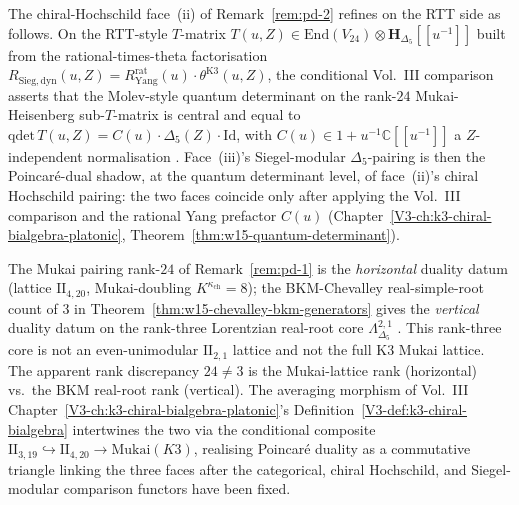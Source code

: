 \begin{remark}
\label{rem:pd-3-supplement}
The chiral-Hochschild face~(ii) of
Remark~\ref{rem:pd-2} refines on the
RTT side as follows. On the
RTT-style $T$-matrix $T(u,Z)\in\mathrm{End}(V_{24})\otimes
\mathbf H_{\Delta_5}[[u^{-1}]]$ built from the rational-times-theta
factorisation $R_{\mathrm{Sieg,dyn}}(u,Z) =
R^{\mathrm{rat}}_{\mathrm{Yang}}(u)\cdot\theta^{\mathrm{K3}}(u,Z)$,
the conditional Vol.~III comparison asserts that the Molev-style
quantum determinant on the rank-$24$
Mukai-Heisenberg sub-$T$-matrix is central and equal to
$\mathrm{qdet}\,T(u,Z) = C(u)\cdot\Delta_5(Z)\cdot\mathrm{Id}$, with
$C(u)\in 1+u^{-1}\mathbb C[[u^{-1}]]$ a $Z$-independent normalisation
\cite{Molev2007,GritsenkoNikulin1998,Gritsenko1999}. Face~(iii)'s
Siegel-modular $\Delta_5$-pairing is then the Poincar\'e-dual
shadow, at the quantum determinant level, of face~(ii)'s chiral
Hochschild pairing: the two faces coincide only after applying the
Vol.~III comparison and the rational Yang prefactor $C(u)$
(Chapter~\ref{V3-ch:k3-chiral-bialgebra-platonic},
Theorem~\ref{thm:w15-quantum-determinant}).
\end{remark}

\begin{remark}
\label{rem:pd-4-supplement}
The Mukai pairing rank-$24$ of Remark~\ref{rem:pd-1} is the
\emph{horizontal} duality datum (lattice $\mathrm{II}_{4,20}$,
Mukai-doubling $K^{\kappa_{\mathrm{ch}}}=8$); the
BKM-Chevalley real-simple-root count of $3$ in
Theorem~\ref{thm:w15-chevalley-bkm-generators} gives the
\emph{vertical} duality datum on the rank-three Lorentzian real-root
core $\Lambda^{2,1}_{\Delta_5}$
\cite{GritsenkoNikulin1997,GritsenkoNikulin1998}. This rank-three
core is not an even-unimodular $\mathrm{II}_{2,1}$ lattice and not
the full K3 Mukai lattice. The apparent rank discrepancy $24\neq3$ is the
Mukai-lattice rank (horizontal) vs.~the BKM real-root rank
(vertical). The averaging morphism of
Vol.~III Chapter~\ref{V3-ch:k3-chiral-bialgebra-platonic}'s
Definition~\ref{V3-def:k3-chiral-bialgebra} intertwines the two via the
conditional composite
$\mathrm{II}_{3,19}\hookrightarrow\mathrm{II}_{4,20}\to
\mathrm{Mukai}(K3)$, realising Poincar\'e duality as a commutative
triangle linking the three faces after the categorical, chiral
Hochschild, and Siegel-modular comparison functors have been fixed.
\end{remark}


